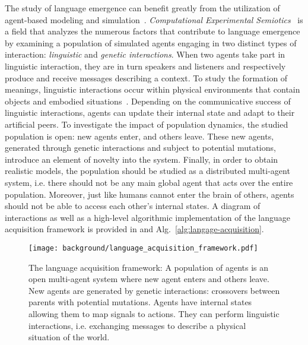 The study of language emergence can benefit greatly from the utilization of agent-based modeling and simulation~\citep{Hurford1989BiologicalEO,birghton2002compositional,cangelosi2002simulating,steels2015talkingheads,kirby2014iterated}. \textit{Computational Experimental Semiotics}~\citep{galantucci2011experimental} is a field that analyzes the numerous factors that contribute to language emergence by examining a population of simulated agents engaging in two distinct types of interaction: \textit{linguistic} and \textit{genetic interactions}. When two agents take part in linguistic interaction, they are in turn speakers and listeners and respectively produce and receive messages describing a context. To study the formation of meanings, linguistic interactions occur within physical environments that contain objects and embodied situations~\citep{steels2012grounded}. Depending on the communicative success of linguistic interactions, agents can update their internal state and adapt to their artificial peers. To investigate the impact of population dynamics, the studied population is open: new agents enter, and others leave. These new agents, generated through genetic interactions and subject to potential mutations, introduce an element of novelty into the system. Finally, in order to obtain realistic models, the population should be studied as a distributed multi-agent system, i.e. there should not be any main global agent that acts over the entire population. Moreover, just like humans cannot enter the brain of others, agents should not be able to access each other's internal states.  A diagram of interactions as well as a high-level algorithmic implementation of the language acquisition framework is provided in  and Alg.~\ref{alg:langage-acquisition}.
\begin{figure}[!h]
\centering
\vspace{-.5cm}
\texttt{[image: background/language\_acquisition\_framework.pdf]}	
\caption{The language acquisition framework: A population of agents is an open multi-agent system where new agent enters and others leave. New agents are generated by genetic interactions: crossovers between parents with potential mutations. Agents have internal states allowing them to map signals to actions. They can perform linguistic interactions, i.e. exchanging messages to describe a physical situation of the world.}
\label{fig:language_acquisition_framework}
\end{figure}
%
